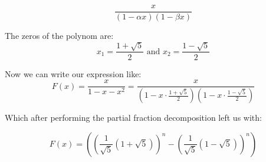 \[
\frac{x}{\left(1 - \alpha x\right)\left(1 - \beta x\right)}
\]

The zeros of the polynom are:
\[
    x_1 = \frac{1 + \sqrt{5}}{2} \text{ and }  x_2 = \frac{1 - \sqrt{5}}{2}    
\]


Now we can write our expression like:
\[
F(x) = \frac{x}{1 - x - x^2} = \frac{x}{\left(1 - x \cdot \frac{1 + \sqrt{5}}{2}\right)\left(1 - x \cdot \frac{1 - \sqrt{5}}{2}\right)}
\]

Which after performing the partial fraction decomposition left us with:

\[
    F(x) = \left( \left( \frac{1}{\sqrt{5}} (1 + \sqrt{5}) \right)^n - \left( \frac{1}{\sqrt{5}} (1 - \sqrt{5}) \right)^n \right)
\]

\QED


\newpage
